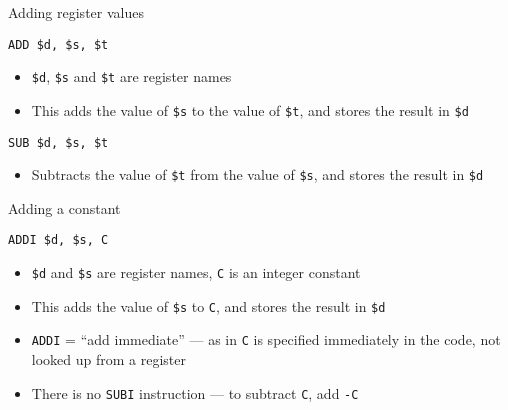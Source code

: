 \begin{frame}[fragile]{Adding register values}
	\pause
	\begin{lstlisting}
ADD $d, $s, $t
	\end{lstlisting}
	\begin{itemize}
		\pause\item \lstinline{$d}, \lstinline{$s} and \lstinline{$t} are register names
		\pause\item This adds the value of \lstinline{$s} to the value of \lstinline{$t},
			and stores the result in \lstinline{$d}
	\end{itemize}
	\pause
	\begin{lstlisting}
SUB $d, $s, $t
	\end{lstlisting}
	\begin{itemize}
		\pause\item Subtracts the value of \lstinline{$t} from the value of \lstinline{$s},
			and stores the result in \lstinline{$d}
	\end{itemize}
\end{frame}

\begin{frame}[fragile]{Adding a constant}
	\pause
	\begin{lstlisting}
ADDI $d, $s, C
	\end{lstlisting}
	\begin{itemize}
		\pause\item \lstinline{$d} and \lstinline{$s} are register names, \lstinline{C} is an integer constant
		\pause\item This adds the value of \lstinline{$s} to \lstinline{C},
			and stores the result in \lstinline{$d}
		\pause\item \lstinline{ADDI} = ``add immediate''
			--- as in \lstinline{C} is specified immediately in the code, not looked up from a register
		\pause\item There is no \lstinline{SUBI} instruction --- to subtract \lstinline{C},
			add \lstinline{-C}
	\end{itemize}
\end{frame}

